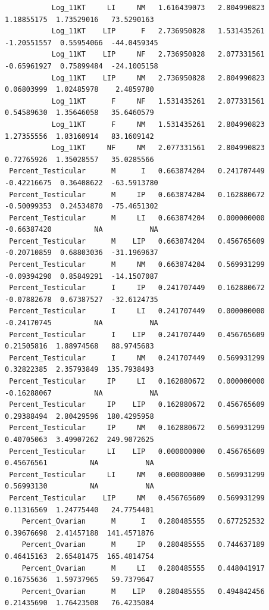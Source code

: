 \documentclass[
  landscape]{article}
\begin{document}
\begin{verbatim}
           Log_11KT     LI     NM   1.616439073   2.804990823    1.18855175  1.73529016   73.5290163
           Log_11KT    LIP      F   2.736950828   1.531435261   -1.20551557  0.55954066  -44.0459345
           Log_11KT    LIP     NF   2.736950828   2.077331561   -0.65961927  0.75899484  -24.1005158
           Log_11KT    LIP     NM   2.736950828   2.804990823    0.06803999  1.02485978    2.4859780
           Log_11KT      F     NF   1.531435261   2.077331561    0.54589630  1.35646058   35.6460579
           Log_11KT      F     NM   1.531435261   2.804990823    1.27355556  1.83160914   83.1609142
           Log_11KT     NF     NM   2.077331561   2.804990823    0.72765926  1.35028557   35.0285566
 Percent_Testicular      M      I   0.663874204   0.241707449   -0.42216675  0.36408622  -63.5913780
 Percent_Testicular      M     IP   0.663874204   0.162880672   -0.50099353  0.24534870  -75.4651302
 Percent_Testicular      M     LI   0.663874204   0.000000000   -0.66387420          NA           NA
 Percent_Testicular      M    LIP   0.663874204   0.456765609   -0.20710859  0.68803036  -31.1969637
 Percent_Testicular      M     NM   0.663874204   0.569931299   -0.09394290  0.85849291  -14.1507087
 Percent_Testicular      I     IP   0.241707449   0.162880672   -0.07882678  0.67387527  -32.6124735
 Percent_Testicular      I     LI   0.241707449   0.000000000   -0.24170745          NA           NA
 Percent_Testicular      I    LIP   0.241707449   0.456765609    0.21505816  1.88974568   88.9745683
 Percent_Testicular      I     NM   0.241707449   0.569931299    0.32822385  2.35793849  135.7938493
 Percent_Testicular     IP     LI   0.162880672   0.000000000   -0.16288067          NA           NA
 Percent_Testicular     IP    LIP   0.162880672   0.456765609    0.29388494  2.80429596  180.4295958
 Percent_Testicular     IP     NM   0.162880672   0.569931299    0.40705063  3.49907262  249.9072625
 Percent_Testicular     LI    LIP   0.000000000   0.456765609    0.45676561          NA           NA
 Percent_Testicular     LI     NM   0.000000000   0.569931299    0.56993130          NA           NA
 Percent_Testicular    LIP     NM   0.456765609   0.569931299    0.11316569  1.24775440   24.7754401
    Percent_Ovarian      M      I   0.280485555   0.677252532    0.39676698  2.41457188  141.4571876
    Percent_Ovarian      M     IP   0.280485555   0.744637189    0.46415163  2.65481475  165.4814754
    Percent_Ovarian      M     LI   0.280485555   0.448041917    0.16755636  1.59737965   59.7379647
    Percent_Ovarian      M    LIP   0.280485555   0.494842456    0.21435690  1.76423508   76.4235084

\end{verbatim}
\end{document}
